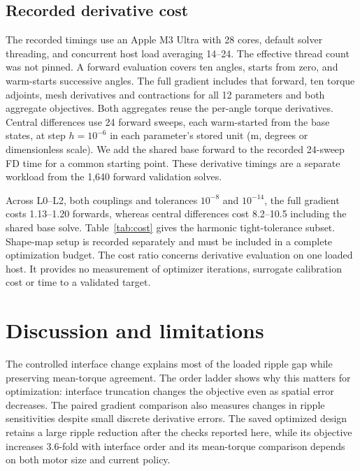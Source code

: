 \documentclass{anvil-paper}
\begin{document}
\subsection{Recorded derivative cost}
The recorded timings use an Apple M3 Ultra with 28 cores, default solver
threading, and concurrent host load averaging 14--24. The effective thread
count was not pinned. A forward evaluation covers ten angles, starts from
zero, and warm-starts successive angles. The full gradient includes that
forward, ten torque adjoints, mesh derivatives and contractions for all
12 parameters and both aggregate objectives. Both aggregates reuse the
per-angle torque derivatives. Central differences use 24 forward sweeps,
each warm-started from the base states, at step $h=10^{-6}$ in each
parameter's stored unit (m, degrees or dimensionless scale). We add the
shared base forward to the recorded 24-sweep FD time for a common starting
point. These derivative timings are a separate workload from the 1,640
forward validation solves.

Across L0--L2, both couplings and tolerances $10^{-8}$ and $10^{-14}$, the
full gradient costs 1.13--1.20 forwards, whereas central differences cost
8.2--10.5 including the shared base solve. Table~\ref{tab:cost} gives the harmonic tight-tolerance subset.
Shape-map setup is recorded separately and must be included in a complete
optimization budget. The cost ratio concerns derivative evaluation
on one loaded host. It provides no measurement of optimizer iterations,
surrogate calibration cost or time to a validated target.

\begin{table}[H]\centering\small
\caption{Recorded harmonic-model cost at relative tolerance $10^{-14}$,
initial design and full current. Times are seconds for ten-angle sweeps;
FD includes the shared base sweep, and setup is a one-time shape-map cost.}
\label{tab:cost}
\end{table}

\section{Discussion and limitations}
The controlled interface change explains most of the loaded ripple gap
while preserving mean-torque agreement. The order ladder shows why this
matters for optimization: interface truncation changes the objective even
as spatial error decreases. The paired gradient comparison also measures
changes in ripple sensitivities despite small discrete derivative errors.
The saved optimized design retains a large ripple reduction after the
checks reported here, while its objective increases 3.6-fold with
interface order and its mean-torque comparison depends on both motor size and current policy.
\end{document}
